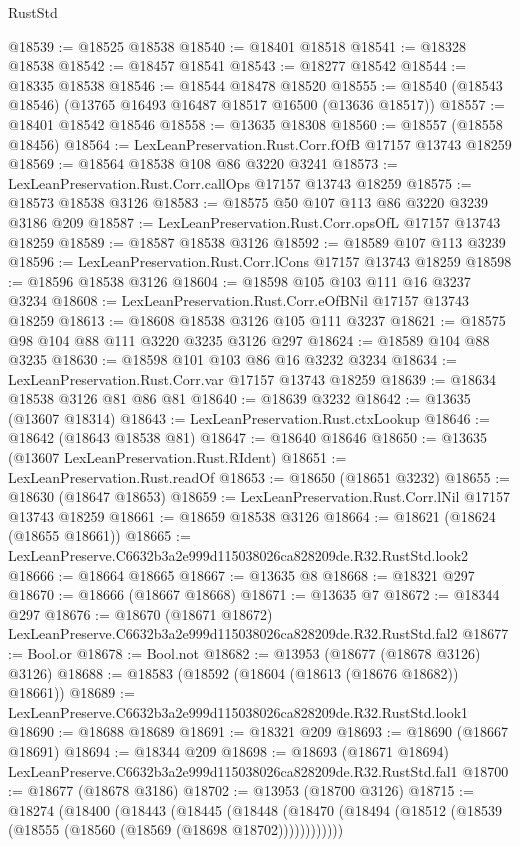 \begin{lexlean}{RustStd}
\begin{coremodule}
@18539 := @18525 @18538
@18540 := @18401 @18518
@18541 := @18328 @18538
@18542 := @18457 @18541
@18543 := @18277 @18542
@18544 := @18335 @18538
@18546 := @18544 @18478 @18520
@18555 := @18540 (@18543 @18546) (@13765 @16493 @16487 @18517 @16500 (@13636 @18517))
@18557 := @18401 @18542 @18546
@18558 := @13635 @18308
@18560 := @18557 (@18558 @18456)
@18564 := LexLeanPreservation.Rust.Corr.fOfB @17157 @13743 @18259
@18569 := @18564 @18538 @108 @86 @3220 @3241
@18573 := LexLeanPreservation.Rust.Corr.callOps @17157 @13743 @18259
@18575 := @18573 @18538 @3126
@18583 := @18575 @50 @107 @113 @86 @3220 @3239 @3186 @209
@18587 := LexLeanPreservation.Rust.Corr.opsOfL @17157 @13743 @18259
@18589 := @18587 @18538 @3126
@18592 := @18589 @107 @113 @3239
@18596 := LexLeanPreservation.Rust.Corr.lCons @17157 @13743 @18259
@18598 := @18596 @18538 @3126
@18604 := @18598 @105 @103 @111 @16 @3237 @3234
@18608 := LexLeanPreservation.Rust.Corr.eOfBNil @17157 @13743 @18259
@18613 := @18608 @18538 @3126 @105 @111 @3237
@18621 := @18575 @98 @104 @88 @111 @3220 @3235 @3126 @297
@18624 := @18589 @104 @88 @3235
@18630 := @18598 @101 @103 @86 @16 @3232 @3234
@18634 := LexLeanPreservation.Rust.Corr.var @17157 @13743 @18259
@18639 := @18634 @18538 @3126 @81 @86 @81
@18640 := @18639 @3232
@18642 := @13635 (@13607 @18314)
@18643 := LexLeanPreservation.Rust.ctxLookup
@18646 := @18642 (@18643 @18538 @81)
@18647 := @18640 @18646
@18650 := @13635 (@13607 LexLeanPreservation.Rust.RIdent)
@18651 := LexLeanPreservation.Rust.readOf
@18653 := @18650 (@18651 @3232)
@18655 := @18630 (@18647 @18653)
@18659 := LexLeanPreservation.Rust.Corr.lNil @17157 @13743 @18259
@18661 := @18659 @18538 @3126
@18664 := @18621 (@18624 (@18655 @18661))
@18665 := LexLeanPreserve.C6632b3a2e999d115038026ca828209de.R32.RustStd.look2
@18666 := @18664 @18665
@18667 := @13635 @8
@18668 := @18321 @297
@18670 := @18666 (@18667 @18668)
@18671 := @13635 @7
@18672 := @18344 @297
@18676 := @18670 (@18671 @18672) LexLeanPreserve.C6632b3a2e999d115038026ca828209de.R32.RustStd.fal2
@18677 := Bool.or
@18678 := Bool.not
@18682 := @13953 (@18677 (@18678 @3126) @3126)
@18688 := @18583 (@18592 (@18604 (@18613 (@18676 @18682)) @18661))
@18689 := LexLeanPreserve.C6632b3a2e999d115038026ca828209de.R32.RustStd.look1
@18690 := @18688 @18689
@18691 := @18321 @209
@18693 := @18690 (@18667 @18691)
@18694 := @18344 @209
@18698 := @18693 (@18671 @18694) LexLeanPreserve.C6632b3a2e999d115038026ca828209de.R32.RustStd.fal1
@18700 := @18677 (@18678 @3186)
@18702 := @13953 (@18700 @3126)
@18715 := @18274
    (@18400
      (@18443
        (@18445
          (@18448 (@18470 (@18494 (@18512 (@18539 (@18555 (@18560 (@18569 (@18698 @18702))))))))))))

\end{coremodule}
\end{lexlean}
